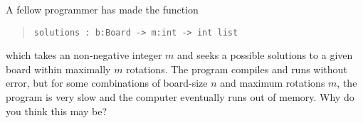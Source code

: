 A fellow programmer has made the function
\begin{quote}
  \lstinline{solutions : b:Board -> m:int -> int list}
\end{quote}
which takes an non-negative integer $m$ and seeks a possible solutions to a given board within maximally $m$ rotations. The program compiles and runs without error, but for some combinations of board-size $n$ and maximum rotations $m$, the program is very slow and the computer eventually runs out of memory. Why do you think this may be?

